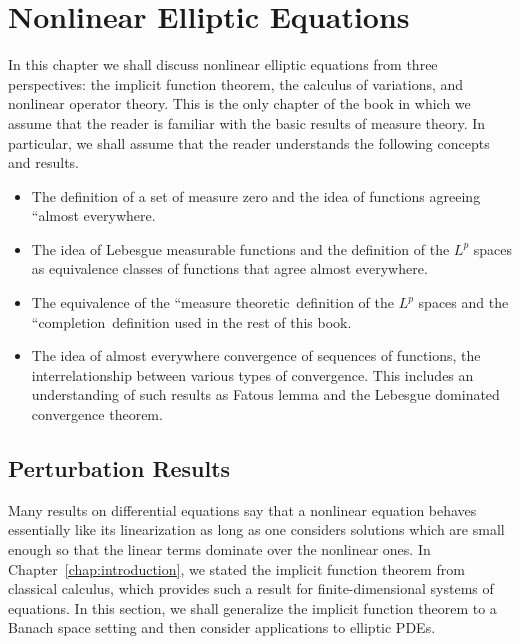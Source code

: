\section{Nonlinear Elliptic Equations}\label{chap:nonlinear-elliptic-equations}

In this chapter we shall discuss nonlinear elliptic equations from three perspectives: the implicit function theorem, the calculus of variations, and nonlinear operator theory. This is the only chapter of the book in which we assume that the reader is familiar with the basic results of measure theory. In particular, we shall assume that the reader understands the following concepts and results.\begin{itemize}\item The definition of a set of measure zero and the idea of functions agreeing ``almost everywhere.\textquotesingle\textquotesingle\item The idea of Lebesgue measurable functions and the definition of the $L^p$ spaces as equivalence classes of functions that agree almost everywhere.\item The equivalence of the ``measure theoretic\textquotesingle\textquotesingle\ definition of the $L^p$ spaces and the ``completion\textquotesingle\textquotesingle\ definition used in the rest of this book.\item The idea of almost everywhere convergence of sequences of functions, the interrelationship between various types of convergence. This includes an understanding of such results as Fatou\textquotesingle s lemma and the Lebesgue dominated convergence theorem.\end{itemize}

\subsection{Perturbation Results}\label{sec:nonlinear-elliptic-perturbation-results}

Many results on differential equations say that a nonlinear equation behaves essentially like its linearization as long as one considers solutions which are small enough so that the linear terms dominate over the nonlinear ones. In Chapter~\ref{chap:introduction}, we stated the implicit function theorem from classical calculus, which provides such a result for finite-dimensional systems of equations. In this section, we shall generalize the implicit function theorem to a Banach space setting and then consider applications to elliptic PDEs.

